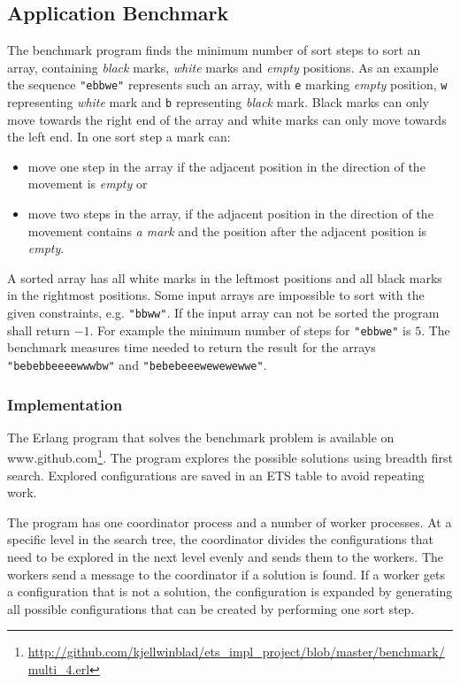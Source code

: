 \documentclass[aps,pre,preprint,nofootinbib]{revtex4}
\begin{document}
\subsection{Application Benchmark}\label{sec:application_bench}
The benchmark program finds the minimum number of sort steps to sort an array, containing \emph{black} marks, \emph{white} marks and \emph{empty} positions.
As an example the sequence \verb|"ebbwe"| represents such an array, with \verb|e| marking \emph{empty} position, \verb|w| representing \emph{white} mark and \verb|b| representing \emph{black} mark.
Black marks can only move towards the right end of the array and white marks can only move towards the left end.
In one sort step a mark can:
\begin{itemize}
\item move one step in the array if the adjacent position in the direction of the movement is \emph{empty} or
\item move two steps in the array, if the adjacent position in the direction of the movement contains \emph{a mark} and the position after the adjacent position is \emph{empty}.
\end{itemize}
A sorted array has all white marks in the leftmost positions and all black marks in the rightmost positions.
Some input arrays are impossible to sort with the given constraints, e.g. \verb|"bbww"|.
If the input array can not be sorted the program shall return $-1$.
For example the minimum number of steps for \verb|"ebbwe"| is $5$.
The benchmark measures time needed to return the result for the arrays \verb|"bebebbeeeewwwbw"| and \verb|"bebebeeewewewewwe"|.

\subsubsection{Implementation}
The Erlang program that solves the benchmark problem is available on www.github.com\footnote{\url{http://github.com/kjellwinblad/ets\_impl\_project/blob/master/benchmark/multi\_4.erl}}.
The program explores the possible solutions using breadth first search.
Explored configurations are saved in an ETS table to avoid repeating work.

The program has one coordinator process and a number of worker processes.
At a specific level in the search tree, the coordinator divides the configurations that need to be explored in the next level evenly and sends them to the workers.
The workers send a message to the coordinator if a solution is found.
If a worker gets a configuration that is not a solution, the configuration is expanded by generating all possible configurations that can be created by performing one sort step.
\end{document}
